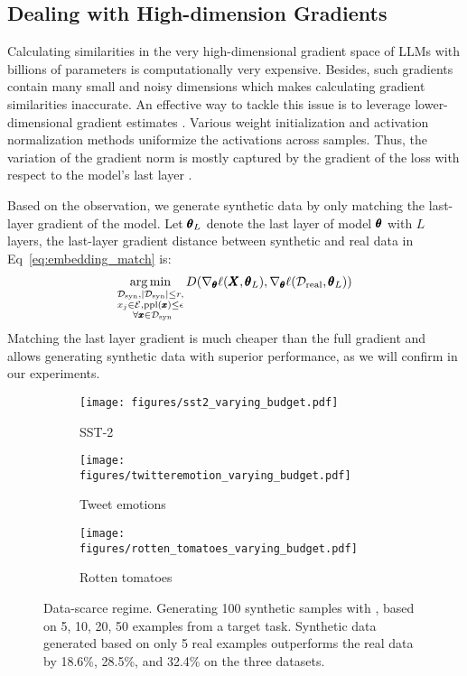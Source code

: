 %

\subsection{Dealing with High-dimension Gradients} 
Calculating similarities in the very high-dimensional gradient space of LLMs with billions of parameters is computationally very expensive. Besides, such gradients contain many small and noisy dimensions which makes calculating gradient similarities inaccurate.
%
An effective way to tackle this issue is to leverage lower-dimensional gradient estimates \cite{mirzasoleiman2020coresets}. 
Various weight initialization \cite{glorot2010understanding} and
activation normalization methods \cite{ioffe2015batch} uniformize the activations across samples. Thus, the variation of the gradient norm is mostly captured by the gradient of the loss with respect to the model's last layer \cite{katharopoulos2018not}.

Based on the observation, we generate synthetic data by only matching the last-layer gradient of the model. 
%
Let $\pmb{\theta}_L$ denote the last layer of model $\pmb{\theta}$ with $L$ layers, the last-layer gradient distance between synthetic and real data in Eq~\ref{eq:embedding_match} is:
\begin{align}\label{eq:cosine_distance}
    \argmin_{\substack{\gD_\text{syn}, |\gD_\text{syn}|\leq r, \\ x_j \in \gE, \text{ppl}(\vct{x}) \leq \epsilon \\~\forall \vct{x}\in \gD_\text{syn}}} 
    D(\nabla_{\thet} \ell(\mtx{X},\thet_L), \nabla_{\thet}\ell(\gD_\text{real},\thet_L)) %
\end{align}
Matching the last layer gradient is much cheaper than the full gradient and allows generating synthetic data with superior performance, as we will confirm in our experiments.

\begin{figure*}[t!]
    \centering
    \begin{subfigure}[b]{0.3\textwidth}
        \texttt{[image: figures/sst2\_varying\_budget.pdf]}
        \caption{SST-2}
        \label{fig:sst2}
    \end{subfigure}
    \hfill
    \begin{subfigure}[b]{0.3\textwidth}
        \texttt{[image: figures/twitteremotion\_varying\_budget.pdf]}
        \caption{Tweet emotions}
        \label{fig:twitteremotion}
    \end{subfigure}
    \hfill
    \begin{subfigure}[b]{0.3\textwidth}
        \texttt{[image: figures/rotten\_tomatoes\_varying\_budget.pdf]}
        \caption{Rotten tomatoes}
        \label{fig:rotten_tomatoes}
    \end{subfigure}
    \hfill
    \vspace{-2mm}
    \caption{{Data-scarce regime.} Generating 100 synthetic samples with \alg, based on 5, 10, 20, 50 examples from a target task. Synthetic data generated based on only 5 real examples outperforms the real data by 18.6\%, 28.5\%, and 32.4\% on the three datasets.}
    \label{fig:match_val_data}
\end{figure*} 
